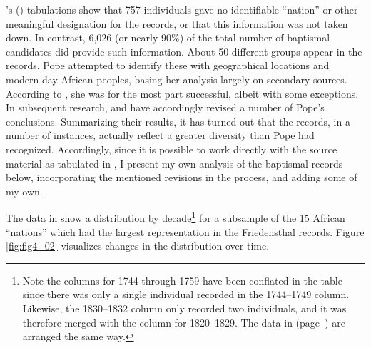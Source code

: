 \documentclass[output=paper,colorlinks,citecolor=brown]{langscibook}
\begin{document}
\citeauthor{Pope_1970}'s (\citeyear{Pope_1970}) tabulations show that 757 individuals gave no identifiable ``nation'' or other meaningful designation for the records, or that this information was not taken down. In contrast, 6,026 (or nearly 90\%) of the total number of baptismal candidates did provide such information. About 50 different groups appear in the records. Pope attempted to identify these with geographical locations and modern-day African peoples, basing her analysis largely on secondary sources. According to \citet[35]{Holsoe_1994}, she was for the most part successful, albeit with some exceptions. In subsequent research, \citet{Sebro_2010} and \citet{Simonsen_2017} have accordingly revised a number of Pope's conclusions. Summarizing their results, it has turned out that the records, in a number of instances, actually reflect a greater diversity than Pope had recognized. Accordingly, since it is possible to work directly with the source material as tabulated in \citet{Pope_1970}, I present my own analysis of the baptismal records below, incorporating the mentioned revisions in the process, and adding some of my own.

The data in  show a distribution by decade\footnote{Note the columns for 1744 through 1759 have been conflated in the table since there was only a single individual recorded in the 1744–1749 column. Likewise, the 1830–1832 column only recorded two individuals, and it was therefore merged with the column for 1820–1829. The data in  (page~\pageref{tab:tab9_02}) are arranged the same way.} for a subsample of the 15 African ``nations'' which had the largest representation in the Friedensthal records. Figure \ref{fig:fig4_02} visualizes changes in the distribution over time.
\end{document}
